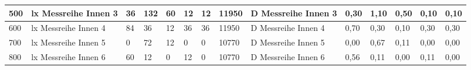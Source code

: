 \begin{table}[H]
{\begin{tabular}{|l|l|l|l|l|l|l|l|l|l|l|l|l|l|}
  500                                             & lx   Messreihe Innen 3                                    & 36                                & 132                               & 60                                & 12                                & 12                                & \cellcolor[HTML]{A9D08E}11950         & D   Messreihe Innen 3                                      & 0,30                                      & 1,10                                       & 0,50                                       & 0,10                                       & 0,10                                       \\ \hline
  \rowcolor[HTML]{E2EFDA} 
  600                                             & lx   Messreihe Innen 4                                    & 84                                & 36                                & 12                                & 36                                & 36                                & \cellcolor[HTML]{A9D08E}11950         & D   Messreihe Innen 4                                      & 0,70                                      & 0,30                                       & 0,10                                       & 0,30                                       & 0,30                                       \\ \hline
  \rowcolor[HTML]{C6E0B4} 
  700                                             & lx  Messreihe Innen 5                                     & 0                                 & 72                                & 12                                & 0                                 & 0                                 & \cellcolor[HTML]{A9D08E}10770         & D  Messreihe Innen 5                                       & 0,00                                      & 0,67                                       & 0,11                                       & 0,00                                       & 0,00                                       \\ \hline
  \rowcolor[HTML]{E2EFDA} 
  800                                             & lx   Messreihe Innen 6                                    & 60                                & 12                                & 0                                 & 12                                & 0                                 & \cellcolor[HTML]{A9D08E}10770         & D   Messreihe Innen 6                                      & 0,56                                      & 0,11                                       & 0,00                                       & 0,11                                       & 0,00                                       \\ \hline
  \end{tabular}%
  }
  \end{table}

